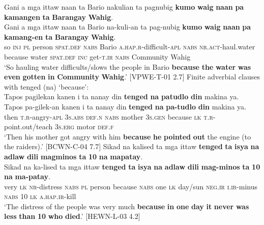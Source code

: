 \z
\ea
Gani  a  mga  ittaw  naan  ta  Bario  nakulian  ta pagnubig  \textbf{kumo}  \textbf{waig}  \textbf{naan}  \textbf{pa}  \textbf{kamangen}  \textbf{ta} \textbf{Barangay}   \textbf{Wahig}. \smallskip\\
\gll Gani  a  mga  ittaw  naan  ta  Bario  na-kuli-an  ta pag-nubig  \textbf{kumo}  \textbf{waig}  \textbf{naan}  \textbf{pa}  \textbf{kamang-en}  \textbf{ta} \textbf{Barangay}   \textbf{Wahig}. \\
so  \textsc{inj}  \textsc{pl}  person  \textsc{spat.def}  \textsc{nabs}  Bario  \textsc{a.hap.r}-difficult-\textsc{apl}  \textsc{nabs}
\textsc{nr.act}-haul.water  because  water  \textsc{spat.def}  \textsc{inc}  get-\textsc{t.ir}  \textsc{nabs}
Community  Wahig \\
\glt `So hauling water difficults/slows the people in Bario \textbf{because} \textbf{the} \textbf{water} \textbf{was} \textbf{even} \textbf{gotten} \textbf{in} \textbf{Community} \textbf{Wahig}.’ [VPWE-T-01 2.7]
\z
\ea
Finite adverbial clauses with tenged (na) ‘because’: \\
Tapos  pagilekan  kanen  i  ta  nanay  din \textbf{tenged}  \textbf{na}  \textbf{patudlo}  \textbf{din}  makina  ya. \smallskip\\
\gll Tapos  pa-gilek-an  kanen  i  ta  nanay  din \textbf{tenged}  \textbf{na}  \textbf{pa-tudlo}  \textbf{din}  makina  ya. \\
then  \textsc{t.r}-angry-\textsc{apl}  3\textsc{s.abs}  \textsc{def.n}  \textsc{nabs}  mother  3\textsc{s.gen}
because  \textsc{lk}  \textsc{t.r}-point.out/teach  3\textsc{s.erg}  motor  \textsc{def.f} \\
\glt `Then his mother got angry with him \textbf{because} \textbf{he} \textbf{pointed} \textbf{out} the engine (to the raiders).’ [BCWN-C-04 7.7]
\z
\ea
Sikad  na  kalised  ta  mga  ittaw  \textbf{tenged}  \textbf{ta}  \textbf{isya}  \textbf{na}  \textbf{adlaw} \textbf{dili}  \textbf{magminos}  \textbf{ta}  \textbf{10}  \textbf{na}  \textbf{mapatay}. \smallskip\\
\gll Sikad  na  ka-lised  ta  mga  ittaw  \textbf{tenged}  \textbf{ta}  \textbf{isya}  \textbf{na}  \textbf{adlaw} \textbf{dili}  \textbf{mag-minos}  \textbf{ta}  \textbf{10}  \textbf{na}  \textbf{ma-patay}. \\
very  \textsc{lk}  \textsc{nr}-distress  \textsc{nabs}  \textsc{pl}  person  because  \textsc{nabs}  one  \textsc{lk}  day/sun
\textsc{neg.ir}  \textsc{i.ir}-minus  \textsc{nabs}  10  \textsc{lk}  \textsc{a.hap.ir}-kill \\
\glt `The distress of the people was very much \textbf{because} \textbf{in} \textbf{one} \textbf{day} \textbf{it} \textbf{never} \textbf{was} \textbf{less} \textbf{than} \textbf{10} \textbf{who} \textbf{died}.’ [HEWN-L-03 4.2]
\z


